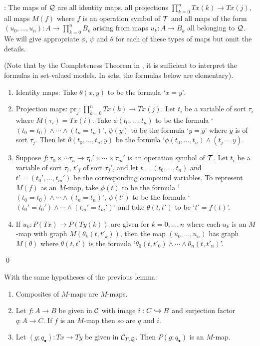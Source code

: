 : The maps of ${\bf \cal Q}$ are all identity maps, all 
projections $\prod_{k=0}^n Tx(k) \to Tx(j)$, all maps $M(f)$ where 
$f$ is an operation symbol of $\cal T$ and all maps of the form 
$(u_0,\ldots,u_n) : A \to \prod_{k=0}^n B_k$ arising from maps $u_k : 
A \to B_k$ all belonging to ${\bf \cal Q}$. We will give appropriate $\phi$, 
$\psi$ and $\theta$ for each of these types of maps but omit the 
details.

(Note that by the Completeness Theorem in \cite{MR}, it is sufficient 
to interpret the formulas in set-valued models. In sets, the formulas 
below are elementary).

\begin{enumerate}
\item Identity maps: Take $\theta(x,y)$ to be the formula `$x=y$'. 
\item Projection maps: $\mbox{pr}_j : \prod_{k=0}^n Tx(k) \to Tx(j)$. 
Let $t_i$ be a variable of sort $\tau_i$ where $M(\tau_i)=Tx(i)$. 
Take $\phi(t_0,\ldots,t_n)$ to be the formula `$(t_0=t_0) \wedge 
\cdots \wedge (t_n=t_n)$', $\psi(y)$ to be the formula `$y=y$' where 
$y$ is of sort $\tau_j$. Then let $\theta(t_0,\ldots,t_n,y)$ be the 
formula `$\phi(t_0,\ldots,t_n) \wedge (t_j=y)$. 

\item Suppose $f : \tau_0 \times \cdots \tau_n \to \tau_0' \times 
\cdots \times \tau_m'$ is an operation symbol of $\cal T$. Let $t_i$ 
be a variable of sort $\tau_i$, $t'_j$ of sort $\tau_j'$, and let 
$t=(t_0,\ldots,t_n)$ and $t'=(t_0',\ldots,t_m')$ be the corresponding 
compound variables. To represent $M(f)$ as an $M$-map, take $\phi(t)$ 
to be the formula `$(t_0=t_0) \wedge \cdots \wedge (t_n=t_n)$', 
$\psi(t')$ to be the formula `$(t_0'=t_0') \wedge \cdots \wedge 
(t_m'=t_m')$' and take $\theta(t,t')$ to be `$t'=f(t)$'. 

\item If $u_k : P(Tx) \to P(Ty(k))$ are given for $k=0,\ldots,n$ 
where each $u_k$ is an $M$-map with graph $M(\theta_k(t,t'_k))$, then 
the map $(u_0,\ldots,u_n)$ has graph $M(\theta)$ where $\theta(t,t')$ 
is the formula `$\theta_0(t,t'_0) \wedge \cdots \wedge 
\theta_n(t,t'_n)$'.
\end{enumerate} \qed

\begin{lem} With the same hypotheses of the previous lemma: 
\begin{enumerate}
\item Composites of $M$-maps are $M$-maps. \item Let $f : A \to B$ be 
given in ${\bf \cal C}$ with image $i : C \hookrightarrow B$ and surjection factor $q : 
A \to C$. If $f$ is an $M$-map then so are $q$ and $i$.
\item Let $(g;q_\bullet) : Tx \to Ty$ be given in ${{\bf \cal C}}_{T,{\bf \cal Q}}$. Then $P(g;q_\bullet)$ is an $M$-map.
\end{enumerate}
\end{lem}

